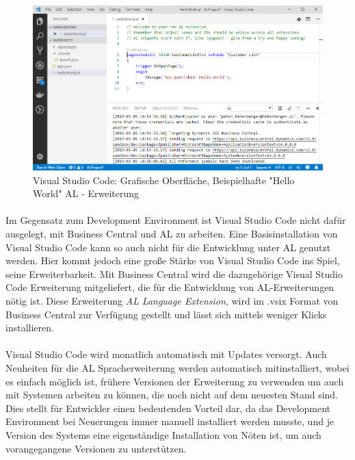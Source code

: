 \begin{figure}[h]
	\centering
	\includegraphics[width=130mm]{images/VSCode}
	\caption{Visual Studio Code: Grafische Oberfläche, Beispielhafte "Hello World" AL - Erweiterung}
	\label{fig:VSCodeGUI}
\end{figure}

\pagebreak
\paragraph{}
Im Gegensatz zum Development Environment ist Visual Studio Code nicht dafür ausgelegt, mit Business Central und AL zu arbeiten. Eine Basisinstallation von Visual Studio Code kann so auch nicht für die Entwicklung unter AL genutzt werden. Hier kommt jedoch eine große Stärke von Visual Studio Code ins Spiel, seine Erweiterbarkeit. Mit Business Central wird die dazugehörige Visual Studio Code Erweiterung mitgeliefert, die für die Entwicklung von AL-Erweiterungen nötig ist. Diese Erweiterung \textit{AL Language Extension}, wird im .vsix Format von Business Central zur Verfügung gestellt und lässt sich mittels weniger Klicks installieren.

\paragraph{}
Visual Studio Code wird monatlich automatisch mit Updates versorgt. Auch Neuheiten für die AL Spracherweiterung werden automatisch mitinstalliert, wobei es einfach möglich ist, frühere Versionen der Erweiterung zu verwenden um auch mit Systemen arbeiten zu können, die noch nicht auf dem neuesten Stand sind. Dies stellt für Entwickler einen bedeutenden Vorteil dar, da das Development Environment bei Neuerungen immer manuell installiert werden musste, und je Version des Systems eine eigenständige Installation von Nöten ist, um auch vorangegangene Versionen zu unterstützen.

